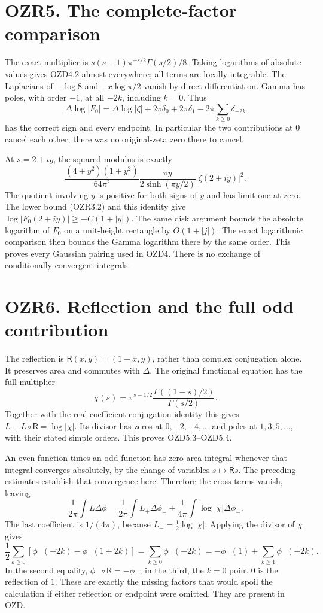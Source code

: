 \section{OZR5. The complete-factor
comparison}\label{ozr5.-the-complete-factor-comparison}

The exact multiplier is \(s(s-1)\pi^{-s/2}\Gamma(s/2)/8\). Taking
logarithms of absolute values gives OZD4.2 almost everywhere; all terms
are locally integrable. The Laplacians of \(-\log8\) and \(-x\log\pi/2\)
vanish by direct differentiation. Gamma has poles, with order \(-1\), at
all \(-2k\), including \(k=0\). Thus \[
\Delta\log|F_0|=\Delta\log|\zeta|
+2\pi\delta_0+2\pi\delta_1
-2\pi\sum_{k\ge0}\delta_{-2k}
\] has the correct sign and every endpoint. In particular the two
contributions at \(0\) cancel each other; there was no original-zeta
zero there to cancel.

At \(s=2+iy\), the squared modulus is exactly \[
\frac{(4+y^2)(1+y^2)}{64\pi^2}
\frac{\pi y}{2\sinh(\pi y/2)}|\zeta(2+iy)|^2.
\] The quotient involving \(y\) is positive for both signs of \(y\) and
has limit one at zero. The lower bound (OZR3.2) and this identity give
\(\log|F_0(2+iy)|\ge-C(1+|y|)\). The same disk argument bounds the
absolute logarithm of \(F_0\) on a unit-height rectangle by
\(O(1+|j|)\). The exact logarithmic comparison then bounds the Gamma
logarithm there by the same order. This proves every Gaussian pairing
used in OZD4. There is no exchange of conditionally convergent
integrals.

\section{OZR6. Reflection and the full odd
contribution}\label{ozr6.-reflection-and-the-full-odd-contribution}

The reflection is \(\mathsf R(x,y)=(1-x,y)\), rather than complex
conjugation alone. It preserves area and commutes with \(\Delta\). The
original functional equation has the full multiplier \[
\chi(s)=\pi^{s-1/2}\frac{\Gamma((1-s)/2)}{\Gamma(s/2)}.
\] Together with the real-coefficient conjugation identity this gives
\(L-L\circ\mathsf R=\log|\chi|\). Its divisor has zeros at
\(0,-2,-4,\ldots\) and poles at \(1,3,5,\ldots\), with their stated
simple orders. This proves OZD5.3--OZD5.4.

An even function times an odd function has zero area integral whenever
that integral converges absolutely, by the change of variables
\(s\mapsto\mathsf R s\). The preceding estimates establish that
convergence here. Therefore the cross terms vanish, leaving \[
\frac1{2\pi}\int L\Delta\phi
=\frac1{2\pi}\int L_+\Delta\phi_+
+\frac1{4\pi}\int\log|\chi|\Delta\phi_-.
\] The last coefficient is \(1/(4\pi)\), because
\(L_-=\tfrac12\log|\chi|\). Applying the divisor of \(\chi\) gives \[
\frac12\sum_{k\ge0}[\phi_-(-2k)-\phi_-(1+2k)]
=\sum_{k\ge0}\phi_-(-2k)
=-\phi_-(1)+\sum_{k\ge1}\phi_-(-2k).
\tag{OZR6.1}
\] In the second equality, \(\phi_-\circ\mathsf R=-\phi_-\); in the
third, the \(k=0\) point \(0\) is the reflection of \(1\). These are
exactly the missing factors that would spoil the calculation if either
reflection or endpoint were omitted. They are present in OZD.

